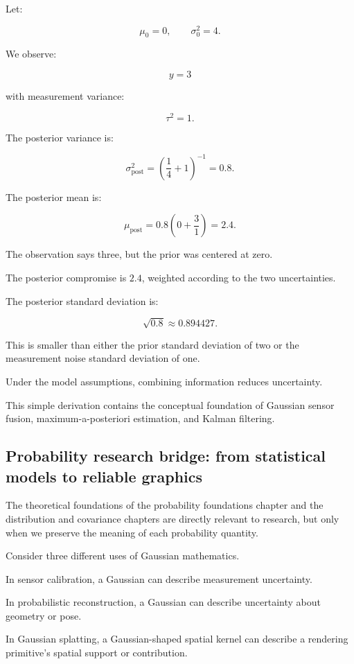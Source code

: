 Let:

\[
 \mu_0=0,\qquad \sigma_0^2=4.
\]

We observe:

\[
 y=3
\]

with measurement variance:

\[
 \tau^2=1.
\]

The posterior variance is:

\[
 \sigma_{\mathrm{post}}^2= \left(\frac14+1\right)^{-1} =\boxed{0.8}.
\]

The posterior mean is:

\[
 \mu_{\mathrm{post}} = 0.8\left(0+\frac31\right) =\boxed{2.4}.
\]

The observation says three, but the prior was centered at zero.

The posterior compromise is \(2.4\), weighted according to the two uncertainties.

The posterior standard deviation is:

\[
 \sqrt{0.8}\approx0.894427.
\]

This is smaller than either the prior standard deviation of two or the measurement noise standard deviation of one.

Under the model assumptions, combining information reduces uncertainty.

This simple derivation contains the conceptual foundation of Gaussian sensor fusion, maximum-a-posteriori estimation, and Kalman filtering.

\subsection{Probability research bridge: from statistical models to reliable graphics}\label{02-foundations-ii-ch031-probability-research-bridge-from-statistical-models-to-reliable-graphics}

The theoretical foundations of the probability foundations chapter and the distribution and covariance chapters are directly relevant to research, but only when we preserve the meaning of each probability quantity.

Consider three different uses of Gaussian mathematics.

In sensor calibration, a Gaussian can describe measurement uncertainty.

In probabilistic reconstruction, a Gaussian can describe uncertainty about geometry or pose.

In Gaussian splatting, a Gaussian-shaped spatial kernel can describe a rendering primitive's spatial support or contribution.

